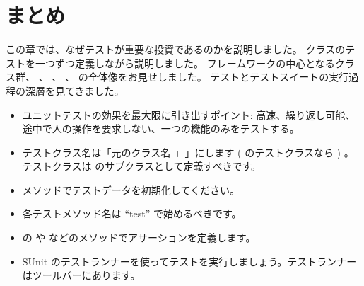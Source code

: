\documentclass[a4paper,10pt,twoside]{book}
\begin{document}
\begin{description}

\end{description}

\section{まとめ}

この章では、なぜテストが重要な投資であるのかを説明しました。
 クラスのテストを一つずつ定義しながら説明しました。
\sunit フレームワークの中心となるクラス群、  、  、  、  の全体像をお見せしました。
テストとテストスイートの実行過程の深層を見てきました。

\begin{itemize}
  \item ユニットテストの効果を最大限に引き出すポイント: 高速、繰り返し可能、 途中で人の操作を要求しない、一つの機能のみをテストする。

  \item テストクラス名は「元のクラス名 +  」にします ( のテストクラスなら ) 。テストクラスは  のサブクラスとして定義すべきです。

  \item {} メソッドでテストデータを初期化してください。

  \item 各テストメソッド名は ``test'' で始めるべきです。

  \item {} の  や  などのメソッドでアサーションを定義します。

  \item SUnit のテストランナーを使ってテストを実行しましょう。テストランナーはツールバーにあります。

\end{itemize}

\ifx\wholebook\relax\else
   
   
\end{document}
